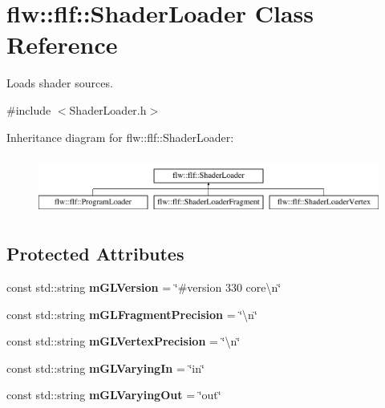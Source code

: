 \hypertarget{classflw_1_1flf_1_1ShaderLoader}{}\section{flw\+:\+:flf\+:\+:Shader\+Loader Class Reference}
\label{classflw_1_1flf_1_1ShaderLoader}


Loads shader sources.  




{\ttfamily \#include $<$Shader\+Loader.\+h$>$}

Inheritance diagram for flw\+:\+:flf\+:\+:Shader\+Loader\+:\begin{figure}[H]
\begin{center}
\leavevmode
\includegraphics[height=1.934370cm]{classflw_1_1flf_1_1ShaderLoader}
\end{center}
\end{figure}
\subsection*{Protected Attributes}
\begin{DoxyCompactItemize}
\item 
const std\+::string {\bfseries m\+G\+L\+Version} = \char`\"{}\#version 330 core\textbackslash{}n\char`\"{}\hypertarget{classflw_1_1flf_1_1ShaderLoader_a5514301f2a3313c6de047b19844a53fa}{}\label{classflw_1_1flf_1_1ShaderLoader_a5514301f2a3313c6de047b19844a53fa}

\item 
const std\+::string {\bfseries m\+G\+L\+Fragment\+Precision} = \char`\"{}\textbackslash{}n\char`\"{}\hypertarget{classflw_1_1flf_1_1ShaderLoader_a90cf28089ee92b3a0ff340dee12eabf3}{}\label{classflw_1_1flf_1_1ShaderLoader_a90cf28089ee92b3a0ff340dee12eabf3}

\item 
const std\+::string {\bfseries m\+G\+L\+Vertex\+Precision} = \char`\"{}\textbackslash{}n\char`\"{}\hypertarget{classflw_1_1flf_1_1ShaderLoader_a336c83eadf34b7c68b87dca554344311}{}\label{classflw_1_1flf_1_1ShaderLoader_a336c83eadf34b7c68b87dca554344311}

\item 
const std\+::string {\bfseries m\+G\+L\+Varying\+In} = \char`\"{}in\char`\"{}\hypertarget{classflw_1_1flf_1_1ShaderLoader_a5a4ad04f734342aa08f7ed634b4752f8}{}\label{classflw_1_1flf_1_1ShaderLoader_a5a4ad04f734342aa08f7ed634b4752f8}

\item 
const std\+::string {\bfseries m\+G\+L\+Varying\+Out} = \char`\"{}out\char`\"{}\hypertarget{classflw_1_1flf_1_1ShaderLoader_a740f5f37efb809c9079e530502d37640}{}\label{classflw_1_1flf_1_1ShaderLoader_a740f5f37efb809c9079e530502d37640}

\end{DoxyCompactItemize}


